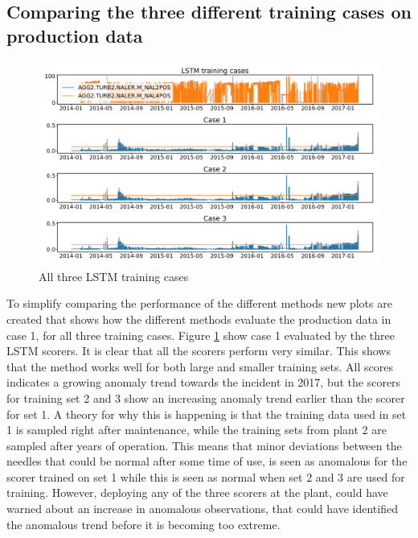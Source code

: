     
    
    \subsection{Comparing the three different training cases on production data}
        \begin{figure}[h!]
            \centering
            \includegraphics[width=\textwidth]{report/figures/analysis/training_cases/lstm_training_cases.png}
            \caption{All three LSTM training cases}
            \label{fig:lstm_training_cases}
        \end{figure}
        To simplify comparing the performance of the different methods new plots are created that shows how the different methods evaluate the production data in case 1, for all three training cases. Figure \ref{fig:lstm_training_cases} show case 1 evaluated by the three LSTM scorers. It is clear that all the scorers perform very similar. This shows that the method works well for both large and smaller training sets. All scores indicates a growing anomaly trend towards the incident in 2017, but the scorers for training set 2 and 3 show an increasing anomaly trend earlier than the scorer for set 1. A theory for why this is happening is that the training data used in set 1 is sampled right after maintenance, while the training sets from plant 2 are sampled after years of operation. This means that minor deviations between the needles that could be normal after some time of use, is seen as anomalous for the scorer trained on set 1 while this is seen as normal when set 2 and 3 are used for training. However, deploying any of the three scorers at the plant, could have warned about an increase in anomalous observations, that could have identified the anomalous trend before it is becoming too extreme. 
        
